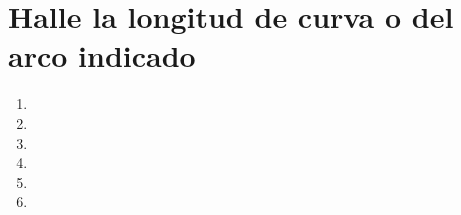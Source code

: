 \documentclass[11pt]{article}
\begin{document}
\section{Halle la longitud de curva o del arco indicado}
\begin{enumerate}[resume,label=\textbf{\arabic*.}]
    \item 
    \item 
    \item 
    \item 
    \item 
    \item 
\end{enumerate}
\end{document}
